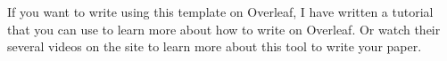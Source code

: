 \documentclass[a4paper]{article}
\begin{document}
If you want to write using this template on Overleaf, I have written a tutorial that you can use to learn more about how to write on Overleaf. Or watch their several videos on the site to learn more about this tool to write your paper. 





\end{document}
